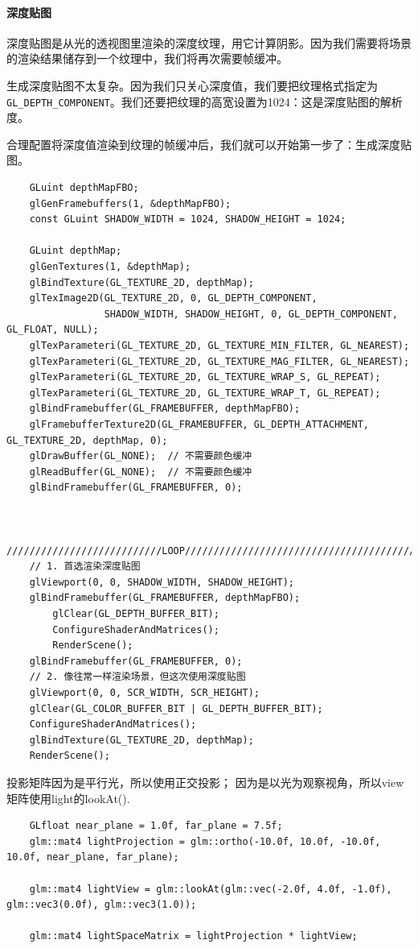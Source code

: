 \documentclass[UTF8,a4paper,12pt]{ctexbook}
\begin{document}
			\paragraph{深度贴图}
				深度贴图是从光的透视图里渲染的深度纹理，用它计算阴影。因为我们需要将场景的渲染结果储存到一个纹理中，我们将再次需要帧缓冲。
				
				生成深度贴图不太复杂。因为我们只关心深度值，我们要把纹理格式指定为\verb|GL_DEPTH_COMPONENT|。我们还要把纹理的高宽设置为1024：这是深度贴图的解析度。
				
				合理配置将深度值渲染到纹理的帧缓冲后，我们就可以开始第一步了：生成深度贴图。
				
				\begin{lstlisting}
	GLuint depthMapFBO;
	glGenFramebuffers(1, &depthMapFBO);	
	const GLuint SHADOW_WIDTH = 1024, SHADOW_HEIGHT = 1024;
	
	GLuint depthMap;
	glGenTextures(1, &depthMap);
	glBindTexture(GL_TEXTURE_2D, depthMap);
	glTexImage2D(GL_TEXTURE_2D, 0, GL_DEPTH_COMPONENT, 
	             SHADOW_WIDTH, SHADOW_HEIGHT, 0, GL_DEPTH_COMPONENT, GL_FLOAT, NULL);
	glTexParameteri(GL_TEXTURE_2D, GL_TEXTURE_MIN_FILTER, GL_NEAREST);
	glTexParameteri(GL_TEXTURE_2D, GL_TEXTURE_MAG_FILTER, GL_NEAREST);
	glTexParameteri(GL_TEXTURE_2D, GL_TEXTURE_WRAP_S, GL_REPEAT); 
	glTexParameteri(GL_TEXTURE_2D, GL_TEXTURE_WRAP_T, GL_REPEAT);
	glBindFramebuffer(GL_FRAMEBUFFER, depthMapFBO);
	glFramebufferTexture2D(GL_FRAMEBUFFER, GL_DEPTH_ATTACHMENT, GL_TEXTURE_2D, depthMap, 0);
	glDrawBuffer(GL_NONE);	// 不需要颜色缓冲
	glReadBuffer(GL_NONE);	// 不需要颜色缓冲
	glBindFramebuffer(GL_FRAMEBUFFER, 0);
	
	
	///////////////////////////LOOP////////////////////////////////////////
	// 1. 首选渲染深度贴图
	glViewport(0, 0, SHADOW_WIDTH, SHADOW_HEIGHT);
	glBindFramebuffer(GL_FRAMEBUFFER, depthMapFBO);
	    glClear(GL_DEPTH_BUFFER_BIT);
	    ConfigureShaderAndMatrices();
	    RenderScene();
	glBindFramebuffer(GL_FRAMEBUFFER, 0);
	// 2. 像往常一样渲染场景，但这次使用深度贴图
	glViewport(0, 0, SCR_WIDTH, SCR_HEIGHT);
	glClear(GL_COLOR_BUFFER_BIT | GL_DEPTH_BUFFER_BIT);
	ConfigureShaderAndMatrices();
	glBindTexture(GL_TEXTURE_2D, depthMap);
	RenderScene();			
				\end{lstlisting}
				
	
	
	投影矩阵因为是平行光，所以使用正交投影； 因为是以光为观察视角，所以view矩阵使用light的lookAt().			
				\begin{lstlisting}
	GLfloat near_plane = 1.0f, far_plane = 7.5f;
	glm::mat4 lightProjection = glm::ortho(-10.0f, 10.0f, -10.0f, 10.0f, near_plane, far_plane);
	
	glm::mat4 lightView = glm::lookAt(glm::vec(-2.0f, 4.0f, -1.0f), glm::vec3(0.0f), glm::vec3(1.0));
	
	glm::mat4 lightSpaceMatrix = lightProjection * lightView;				
				\end{lstlisting}
				
\end{document}
